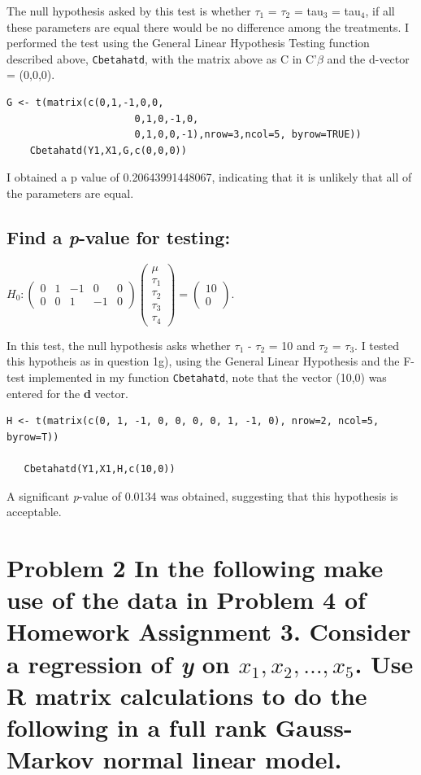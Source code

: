 \documentclass[11pt]{article}
\begin{document}
The null hypothesis asked by this test is whether $\tau$$_1$ = $\tau$$_2$ =
tau$_3$ = tau$_4$, if all these parameters are equal there would be no
difference among the treatments. I performed the test using the General Linear
Hypothesis Testing function described above, \verb~Cbetahatd~, with the
matrix above as C in C'$\beta$ and the d-vector = (0,0,0).


\begin{verbatim}
G <- t(matrix(c(0,1,-1,0,0,
                      0,1,0,-1,0,
                      0,1,0,0,-1),nrow=3,ncol=5, byrow=TRUE))
    Cbetahatd(Y1,X1,G,c(0,0,0))
\end{verbatim}


I obtained a p value of 0.20643991448067, indicating that it is
unlikely that all of the parameters are equal. 
\subsection{Find a \emph{p}-value for testing:}
\label{sec-1-8}

\(H_0 : \begin{pmatrix} 0 & 1 & -1 & 0 & 0 \\ 0 & 0 & 1 & -1 & 0
\end{pmatrix} \begin{pmatrix} \mu \\ \tau_1 \\ \tau_2 \\ \tau_3
\\ \tau_4 \end{pmatrix} = \begin{pmatrix} 10 \\ 0  \end{pmatrix}.\)

In this test, the null hypothesis asks whether $\tau$$_1$ - $\tau$$_2$ = 10
and $\tau$$_2$ = $\tau$$_3$. I tested this hypotheis as in question 1g), using the General Linear
Hypothesis and the F-test implemented in my function \verb~Cbetahatd~,
note that the vector (10,0) was entered for the \textbf{d} vector.


\begin{verbatim}
H <- t(matrix(c(0, 1, -1, 0, 0, 0, 0, 1, -1, 0), nrow=2, ncol=5, byrow=T))

   Cbetahatd(Y1,X1,H,c(10,0))
\end{verbatim}

A significant \emph{p}-value of 0.0134 was obtained, suggesting that this
hypothesis is acceptable.
\section{Problem 2 In the following make use of the data in Problem 4 of Homework Assignment 3. Consider a regression of \emph{y} on $x_1, x_2,\ldots,x_5$. Use R matrix calculations to do the following in a full rank Gauss-Markov normal linear model.}
\label{sec-2}
\end{document}
